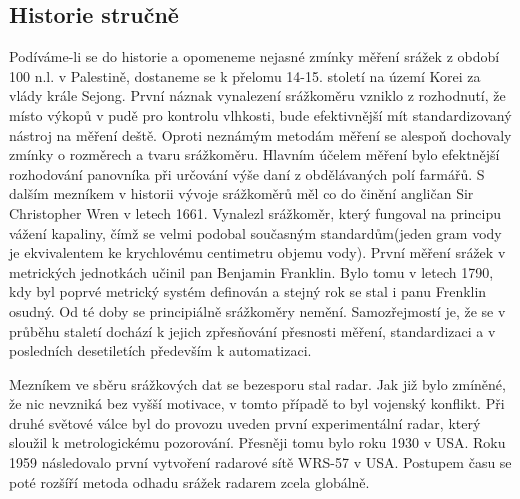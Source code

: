 \documentclass[a4paper,12pt]{article}
\begin{document}
\subsection{Historie stručně}
Podíváme-li se do historie a opomeneme nejasné zmínky měření srážek z období 100 n.l. v Palestině, dostaneme se k přelomu 14-15. století na území Korei za vlády krále Sejong.\cite{sejong} První náznak vynalezení srážkoměru vzniklo z rozhodnutí, že místo výkopů v pudě pro kontrolu vlhkosti, bude efektivnější mít standardizovaný nástroj na měření deště. Oproti neznámým metodám měření se alespoň dochovaly zmínky o rozměrech a tvaru srážkoměru. Hlavním účelem měření bylo efektnější rozhodování panovníka při určování výše daní z obdělávaných polí farmářů. S dalším mezníkem v historii vývoje srážkoměrů měl co do činění angličan Sir Christopher Wren v letech 1661.\cite{wren} Vynalezl srážkoměr, který fungoval na principu vážení kapaliny, čímž se velmi podobal současným standardům(jeden gram vody je ekvivalentem ke krychlovému centimetru objemu vody). První měření srážek v metrických jednotkách učinil pan Benjamin Franklin. Bylo tomu v letech 1790, kdy byl poprvé metrický systém definován a stejný rok se stal i panu Frenklin osudný. Od té doby se principiálně srážkoměry nemění. Samozřejmostí je, že se v průběhu staletí dochází k jejich  zpřesňování přesnosti měření, standardizaci a v posledních desetiletích především k automatizaci.

Mezníkem ve sběru srážkových dat se bezesporu stal radar. Jak již bylo zmíněné, že nic nevzniká bez vyšší motivace, v tomto případě to byl vojenský konflikt. Při druhé světové válce byl do provozu uveden první experimentální radar, který sloužil k metrologickému pozorování. Přesněji tomu bylo roku 1930 v USA. \cite{flash_floods} Roku 1959 následovalo první vytvoření radarové sítě WRS-57 v USA. Postupem času se poté rozšíří metoda odhadu srážek radarem zcela globálně. 

     
\end{document}
